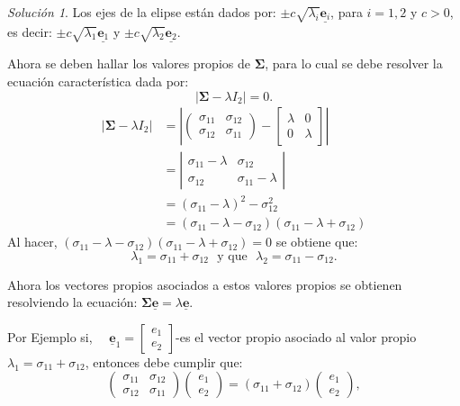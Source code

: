 \documentclass[
]{book}
\theoremstyle{definition}
\theoremstyle{definition}
\theoremstyle{definition}
\theoremstyle{definition}
\theoremstyle{remark}
\newtheorem*{solution}{Solución}
\begin{document}
\begin{solution}
Los ejes de la elipse están dados por: \(\pm c \sqrt{\lambda_i} \underline{\mathbf{e}_i}\), para \(i=1,2\) y \(c>0\), es decir: \(\pm c \sqrt{\lambda_1} \underline{\mathbf{e}_1}\) y \(\pm c \sqrt{\lambda_2} \underline{\mathbf{e}_2}\).

Ahora se deben hallar los valores propios de \(\mathbf{\Sigma}\), para lo cual se debe resolver la ecuación característica dada por:
\[
|\mathbf{\Sigma}-\lambda I_2|=0.
\]
\begin{align*}
|\mathbf{\Sigma}-\lambda I_2|&=\left|\begin{pmatrix}
\sigma_{11} & \sigma_{12}\\
\sigma_{12} & \sigma_{11}
\end{pmatrix}-\begin{bmatrix}
\lambda & 0\\
0 & \lambda
\end{bmatrix}\right|\\
&=\left|\begin{matrix}
\sigma_{11}-\lambda & \sigma_{12}\\
\sigma_{12} & \sigma_{11}-\lambda
\end{matrix}\right|\\
&=(\sigma_{11}-\lambda)^2-\sigma_{12}^2\\
&=(\sigma_{11}-\lambda-\sigma_{12})(\sigma_{11}-\lambda+\sigma_{12})
\end{align*}
Al hacer, \((\sigma_{11}-\lambda-\sigma_{12})(\sigma_{11}-\lambda+\sigma_{12})=0\) se obtiene que:
\[
\lambda_1=\sigma_{11}+\sigma_{12}\ \ \ \text{y que}\ \ \  \lambda_2=\sigma_{11}-\sigma_{12}.
\]

Ahora los vectores propios asociados a estos valores propios se obtienen resolviendo la ecuación: \(\mathbf{\Sigma} \underline{\mathbf{e}}=\lambda \underline{\mathbf{e}}\).

Por Ejemplo si,~~
\(\underline{\mathbf{e}}_1=\begin{bmatrix} e_1\\ e_2 \end{bmatrix}\)-es el vector propio asociado al valor propio \(\lambda_1=\sigma_{11}+\sigma_{12}\), entonces debe cumplir que:
\[
\begin{pmatrix}
\sigma_{11} & \sigma_{12} \\
\sigma_{12} & \sigma_{11}
\end{pmatrix} \begin{pmatrix}
e_1 \\ e_2 \end{pmatrix} = (\sigma_{11}+\sigma_{12})\begin{pmatrix}
e_1 \\ e_2 \end{pmatrix},
\]


\end{solution}
\end{document}
